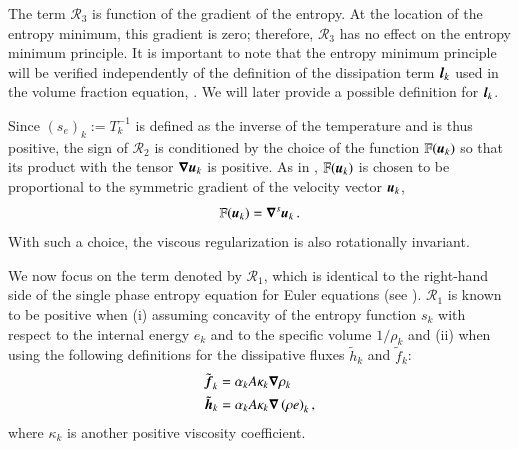 \documentclass[preprint,10pt]{elsarticle}
\begin{document}
The term ${\mathcal{R}_3}$ is  function of the gradient of the entropy.  
At the location of the entropy minimum, this gradient is zero; therefore, $\mathcal{R}_3$ 
has no effect on the entropy minimum principle. It is important to note that the entropy minimum principle will be verified
independently of the definition of the dissipation term $\boldsymbol l_k$ used in the volume fraction
equation, . We will later provide a possible definition for $\boldsymbol l_k$.

Since $(s_e)_k:=T_k^{-1}$ is defined as the inverse of the temperature and is thus positive, the sign of $\mathcal{R}_2$ is 
conditioned by the choice of the function $\mathbb{F}(\boldsymbol u_k)$ so that its product with the tensor $\boldsymbol\nabla \boldsymbol u_k$ is 
positive. As in \cite{jlg, Marco_paper_low_mach}, $\mathbb{F}(\boldsymbol u_k)$ is chosen to be proportional to the symmetric 
gradient of the velocity vector $\boldsymbol u_k$, %
\begin{equation}
\mathbb{F}(\boldsymbol u_k) = \boldsymbol\nabla^s \boldsymbol u_k \,.
\end{equation}
With such a choice, the viscous regularization is also rotationally invariant.
%

We now focus on the term denoted by $\mathcal{R}_1$, which is identical to the right-hand side of the single phase entropy 
equation for Euler equations (see \cite{jlg, Marco_paper_low_mach}). $\mathcal{R}_1$ is known to be positive when 
(i) assuming concavity of the entropy function $s_k$ with respect to the internal energy $e_k$ and to the specific 
volume $1 / \rho_k$ and (ii) when using the following definitions for the dissipative fluxes $\tilde{h}_k$ and $\tilde{f}_k$:
%
\begin{subequations} \label{eq:def_visc}
\begin{align}
&\tilde{\boldsymbol f}_k = \alpha_k A \kappa_k \boldsymbol\nabla \rho_k \\
&\tilde{\boldsymbol h}_k = \alpha_k A \kappa_k \boldsymbol\nabla \left( \rho e \right)_k,
\end{align}
\end{subequations}
%  
where $\kappa_k$ is another positive viscosity coefficient. 
\end{document}
